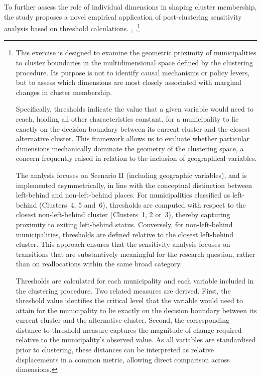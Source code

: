 \documentclass[a4paper,11pt,oneside]{article}
\begin{document}
To further assess the role of individual dimensions in shaping cluster membership, the study proposes a novel empirical application of post-clustering sensitivity analysis based on threshold calculations. \citep{hastie2009elements}, \citep{bishop2006pattern}.\footnote{  This exercise is designed to examine the geometric proximity of municipalities to cluster boundaries in the multidimensional space defined by the clustering procedure. Its purpose is not to identify causal mechanisms or policy levers, but to assess which dimensions are most closely associated with marginal changes in cluster membership.

Specifically, thresholds indicate the value that a given variable would need to reach, holding all other characteristics constant, for a municipality to lie exactly on the decision boundary between its current cluster and the closest alternative cluster. This framework allows us to evaluate whether particular dimensions mechanically dominate the geometry of the clustering space, a concern frequently raised in relation to the inclusion of geographical variables.

The analysis focuses on Scenario II (including geographic variables), and is implemented asymmetrically, in line with the conceptual distinction between left-behind and non-left-behind places. For municipalities classified as left-behind (Clusters~4, 5 and~6), thresholds are computed with respect to the closest non-left-behind cluster (Clusters~1, 2 or~3), thereby capturing proximity to exiting left-behind status. Conversely, for non-left-behind municipalities, thresholds are defined relative to the closest left-behind cluster. This approach ensures that the sensitivity analysis focuses on transitions that are substantively meaningful for the research question, rather than on reallocations within the same broad category.

Thresholds are calculated for each municipality and each variable included in the clustering procedure. Two related measures are derived. First, the threshold value identifies the critical level that the variable would need to attain for the municipality to lie exactly on the decision boundary between its current cluster and the alternative cluster. Second, the corresponding distance-to-threshold measure captures the magnitude of change required relative to the municipality’s observed value. As all variables are standardised prior to clustering, these distances can be interpreted as relative displacements in a common metric, allowing direct comparison across dimensions.}
\end{document}
